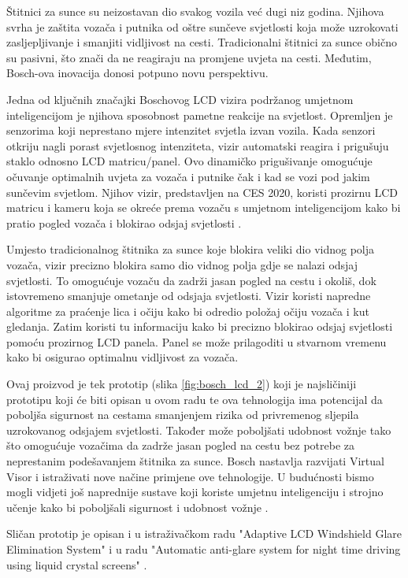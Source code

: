 \documentclass{foi}
\begin{document}
Štitnici za sunce su neizostavan dio svakog vozila već dugi niz godina. Njihova svrha je zaštita vozača i putnika od oštre sunčeve svjetlosti koja može uzrokovati zasljepljivanje i smanjiti vidljivost na cesti. Tradicionalni štitnici za sunce obično su pasivni, što znači da ne reagiraju na promjene uvjeta na cesti. Međutim, Bosch-ova inovacija donosi potpuno novu perspektivu.

Jedna od ključnih značajki Boschovog LCD vizira podržanog umjetnom inteligencijom je njihova sposobnost pametne reakcije na svjetlost. Opremljen je senzorima koji neprestano mjere intenzitet svjetla izvan vozila. Kada senzori otkriju nagli porast svjetlosnog intenziteta, vizir automatski reagira i prigušuju staklo odnosno LCD matricu/panel. Ovo dinamičko prigušivanje omogućuje očuvanje optimalnih uvjeta za vozača i putnike čak i kad se vozi pod jakim sunčevim svjetlom. Njihov vizir, predstavljen na CES 2020, koristi prozirnu LCD matricu i kameru koja se okreće prema vozaču s umjetnom inteligencijom kako bi pratio pogled vozača i blokirao odsjaj svjetlosti \cite{Chris}.

Umjesto tradicionalnog štitnika za sunce koje blokira veliki dio vidnog polja vozača, vizir precizno blokira samo dio vidnog polja gdje se nalazi odsjaj svjetlosti. To omogućuje vozaču da zadrži jasan pogled na cestu i okoliš, dok istovremeno smanjuje ometanje od odsjaja svjetlosti. Vizir koristi napredne algoritme za praćenje lica i očiju kako bi odredio položaj očiju vozača i kut gledanja. Zatim koristi tu informaciju kako bi precizno blokirao odsjaj svjetlosti pomoću prozirnog LCD panela. Panel se može prilagoditi u stvarnom vremenu kako bi osigurao optimalnu vidljivost za vozača.

Ovaj proizvod je tek prototip (slika \ref{fig:bosch_lcd_2}) koji je najsličiniji prototipu koji će biti opisan u ovom radu te ova tehnologija ima potencijal da poboljša sigurnost na cestama smanjenjem rizika od privremenog sljepila uzrokovanog odsjajem svjetlosti. Također može poboljšati udobnost vožnje tako što omogućuje vozačima da zadrže jasan pogled na cestu bez potrebe za neprestanim podešavanjem štitnika za sunce. Bosch nastavlja razvijati Virtual Visor i istraživati nove načine primjene ove tehnologije. U budućnosti bismo mogli vidjeti još naprednije sustave koji koriste umjetnu inteligenciju i strojno učenje kako bi poboljšali sigurnost i udobnost vožnje \cite{Chris}.

Sličan prototip je opisan i u istraživačkom radu "Adaptive LCD Windshield Glare Elimination System" \cite{Shreesha2019} i u radu "Automatic anti-glare system for night time driving using liquid crystal screens" \cite{Pankaj}.
\end{document}
